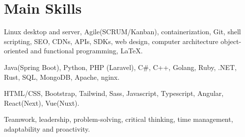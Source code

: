 \section{Main Skills}
{Linux desktop and server, Agile(SCRUM/Kanban), containerization, Git, shell scripting, SEO, CDNs, APIs, SDKs, web design, computer architecture object-oriented and functional programming, {\LaTeX}.}

{Java(Spring Boot), Python, PHP (Laravel), C\#, C++, Golang, Ruby, .NET, Rust, SQL, MongoDB, Apache, nginx.}

{HTML/CSS, Bootstrap, Tailwind, Sass, Javascript, Typescript, Angular, React(Next), Vue(Nuxt).}

{Teamwork, leadership, problem-solving, critical thinking, time management, adaptability and proactivity.}
